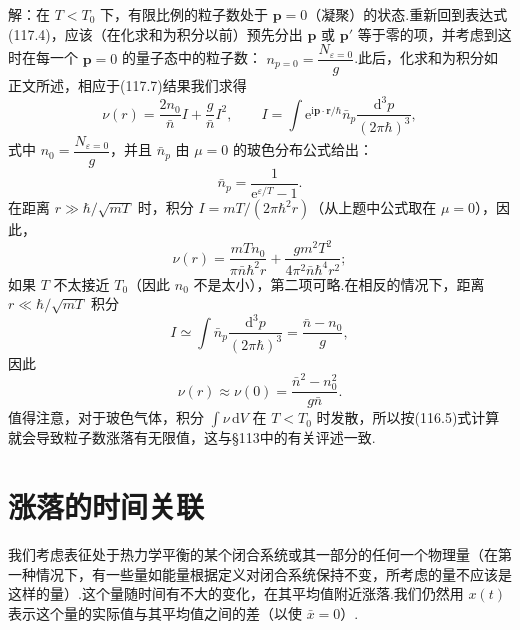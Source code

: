 \begin{xiti}
解：在 $T<T_{0}$ 下，有限比例的粒子数处于 $\boldsymbol{p}=0$（凝聚）的状态.重新回到表达式(117.4)，应该（在化求和为积分以前）预先分出 $\boldsymbol{p}$ 或
$\boldsymbol{p}'$ 等于零的项，并考虑到这时在每一个 $\boldsymbol{p}=0$ 的量子态中的粒子数：
$n_{p=0}=\dfrac{N_{\varepsilon=0}}{g}$.此后，化求和为积分如正文所述，相应于(117.7)结果我们求得
\begin{equation*}
  \nu(r)=\frac{2n_{0}}{\bar{n}}I+\frac{g}{\bar{n}}I^{2},\qquad
  I=\int\mathrm{e}^{\mathrm{i}\boldsymbol{p}\cdot\boldsymbol{r}/\hbar}
  \bar{n}_{p}\frac{\mathrm{d}^{3}p}{(2\pi\hbar)^{3}},
\end{equation*}
式中 $n_{0}=\dfrac{N_{\varepsilon=0}}{g}$，并且 $\bar{n}_{p}$ 由 $\mu=0$
的玻色分布公式给出：
\begin{equation*}
  \bar{n}_{p}=\frac{1}{\mathrm{e}^{\varepsilon/T}-1}.
\end{equation*}
在距离 $r\gg\hbar/\sqrt{mT}$ 时，积分 $I=mT/(2\pi\hbar^{2}r)$（从上题中公式取在
$\mu=0$），因此，
\begin{equation*}
  \nu(r)=\frac{mTn_{0}}{\pi\bar{n}\hbar^{2}r}
  +\frac{gm^{2}T^{2}}{4\pi^{2}\bar{n}\hbar^{4}r^{2}};
\end{equation*}
如果 $T$ 不太接近 $T_{0}$（因此 $n_{0}$ 不是太小），第二项可略.在相反的情况下，距离
$r\ll\hbar/\sqrt{mT}$ 积分
\begin{equation*}
  I\simeq\int\bar{n}_{p}\frac{\mathrm{d}^{3}p}{(2\pi\hbar)^{3}}
  =\frac{\bar{n}-n_{0}}{g},
\end{equation*}
因此
\begin{equation*}
  \nu(r)\approx\nu(0)=\frac{\bar{n}^{2}-n_{0}^{2}}{g\bar{n}}.
\end{equation*}
值得注意，对于玻色气体，积分 $\int\nu\,\mathrm{d}V$ 在 $T<T_{0}$ 时发散，所以按(116.5)式计算就会导致粒子数涨落有无限值，这与§113中的有关评述一致.

\end{xiti}

\section{涨落的时间关联}

我们考虑表征处于热力学平衡的某个闭合系统或其一部分的任何一个物理量（在第一种情况下，有一些量如能量根据定义对闭合系统保持不变，所考虑的量不应该是这样的量）.这个量随时间有不大的变化，在其平均值附近涨落.我们仍然用 $x(t)$ 表示这个量的实际值与其平均值之间的差（以使 $\bar{x}=0$）.


